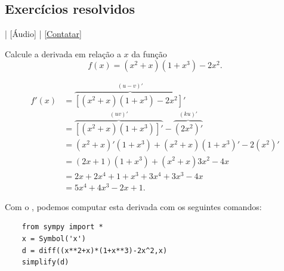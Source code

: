 \subsection*{Exercícios resolvidos}

\begin{flushright}
  [Vídeo] | [Áudio] | \href{https://phkonzen.github.io/notas/contato.html}{[Contatar]}
\end{flushright}

\begin{exeresol}
  Calcule a derivada em relação a $x$ da função
  \begin{equation}
    f(x) = (x^2+x)(1 + x^3) - 2x^2.
  \end{equation}
\end{exeresol}
\begin{resol}
  \begin{align}
    f'(x) &= \overbrace{\left[(x^2+x)(1 + x^3) - 2x^2\right]'}^{(u-v)'} \\
          &= \overbrace{\left[(x^2+x)(1 + x^3)\right]'}^{(uv)'} - \overbrace{(2x^2)'}^{(ku)'} \\
          &= (x^2+x)'(1+x^3) + (x^2+x)(1+x^3)' - 2(x^2)'\\
          &= (2x+1)(1+x^3) + (x^2+x)3x^2 - 4x\\
          &= 2x+2x^4+1+x^3+3x^4+3x^3-4x\\
          &= 5x^4+4x^3-2x+1.
  \end{align}
  
  \ifispython
  Com o \sympy, podemos computar esta derivada com os seguintes comandos:
  \begin{lstlisting}
    from sympy import *
    x = Symbol('x')
    d = diff((x**2+x)*(1+x**3)-2x^2,x)
    simplify(d)
  \end{lstlisting}
  \fi
\end{resol}

